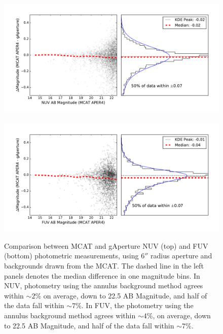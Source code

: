 \documentclass[preprint]{aastex}
\begin{document}
\begin{figure}[t!]
\includegraphics[scale=0.64]{Fig05a.pdf}\\\\
\includegraphics[scale=0.64]{Fig05b.pdf}
\caption{Comparison between MCAT and gAperture NUV (top) and FUV (bottom) photometric measurements, using $6''$ radius aperture and backgrounds drawn from the MCAT. The dashed line in the left panels denotes the median difference in one magnitude bins. In NUV, photometry using the annulus background method agrees within $\sim 2$\% on average, down to 22.5 AB Magnitude, and half of the data fall within $\sim 7$\%. In FUV, the photometry using the annulus background method agrees within $\sim 4$\%, on average, down to 22.5 AB Magnitude, and half of the data fall within $\sim 7$\%.
\label{mcatrelphot}}
\end{figure}
\clearpage
\end{document}
